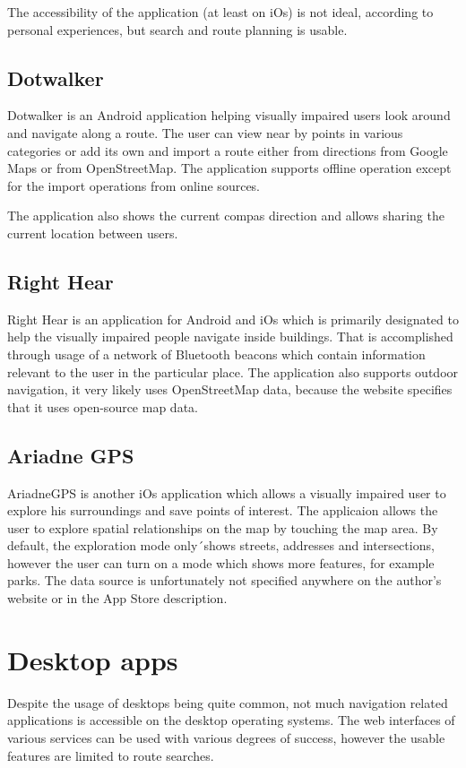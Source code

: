 \documentclass[nolof,digital]{fithesis3}
\begin{document}
The accessibility of the application (at least on iOs) is not ideal, according to personal experiences, but search and route planning is usable.
\subsection{Dotwalker}
Dotwalker \parencite{dotwalker} is an Android application helping visually impaired users look around and navigate along a route. The user can view near by points in various categories or add its own and import a route either from directions from Google Maps or from OpenStreetMap. The application supports offline operation except for the import operations from online sources.

The application also shows the current compas direction and allows sharing the current location between users.
\subsection{Right Hear}
Right Hear \parencite{righthear} is an application for Android and iOs which is primarily designated to help the visually impaired people navigate inside buildings. That is accomplished through usage of a network of Bluetooth beacons which contain information relevant to the user in the particular place. The application also supports outdoor navigation, it very likely uses OpenStreetMap data, because the website specifies that it uses open-source map data.
\subsection{Ariadne GPS}
AriadneGPS \parencite{ariadnegps} is another iOs application which allows a visually impaired  user to explore his surroundings and save points of interest. The applicaion allows the user to explore spatial relationships on the map by touching the map area. By default, the exploration mode only´shows streets, addresses and intersections, however the user can turn on a mode which shows more features, for example parks. The data source is unfortunately not specified anywhere on the author's website or in the App Store description.
\section{Desktop apps}
Despite the usage of desktops being quite common, not much navigation related applications is accessible on the desktop operating systems. The web interfaces of various services can be used with various degrees of success, however the usable features are limited to route searches.
\end{document}
